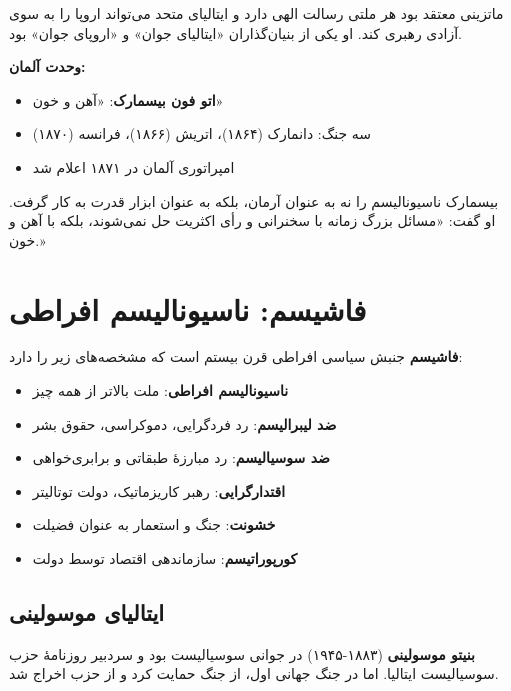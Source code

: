 ماتزینی معتقد بود هر ملتی رسالت الهی دارد و ایتالیای متحد می‌تواند اروپا را به سوی آزادی رهبری کند. او یکی از بنیان‌گذاران «ایتالیای جوان» و «اروپای جوان» بود.

\textbf{وحدت آلمان:}
\begin{itemize}
    \item \textbf{اتو فون بیسمارک}: «آهن و خون»
    \item سه جنگ: دانمارک (۱۸۶۴)، اتریش (۱۸۶۶)، فرانسه (۱۸۷۰)
    \item امپراتوری آلمان در ۱۸۷۱ اعلام شد
\end{itemize}

بیسمارک ناسیونالیسم را نه به عنوان آرمان، بلکه به عنوان ابزار قدرت به کار گرفت. او گفت: «مسائل بزرگ زمانه با سخنرانی و رأی اکثریت حل نمی‌شوند، بلکه با آهن و خون.»


\section{فاشیسم: ناسیونالیسم افراطی}

\begin{tcolorbox}[
    enhanced,
    colback=rightblue!8,
    colframe=rightblue,
    boxrule=1.5pt,
    arc=5pt,
    fonttitle=\bfseries,
    title={\rl{🔵 تعریف کلیدی: فاشیسم}}
]
\textbf{فاشیسم} جنبش سیاسی افراطی قرن بیستم است که مشخصه‌های زیر را دارد:
\begin{itemize}
    \item \textbf{ناسیونالیسم افراطی}: ملت بالاتر از همه چیز
    \item \textbf{ضد لیبرالیسم}: رد فردگرایی، دموکراسی، حقوق بشر
    \item \textbf{ضد سوسیالیسم}: رد مبارزهٔ طبقاتی و برابری‌خواهی
    \item \textbf{اقتدارگرایی}: رهبر کاریزماتیک، دولت توتالیتر
    \item \textbf{خشونت}: جنگ و استعمار به عنوان فضیلت
    \item \textbf{کورپوراتیسم}: سازماندهی اقتصاد توسط دولت
\end{itemize}
\end{tcolorbox}

\subsection{ایتالیای موسولینی}


\textbf{بنیتو موسولینی} (۱۸۸۳-۱۹۴۵) در جوانی سوسیالیست بود و سردبیر روزنامهٔ حزب سوسیالیست ایتالیا. اما در جنگ جهانی اول، از جنگ حمایت کرد و از حزب اخراج شد.

